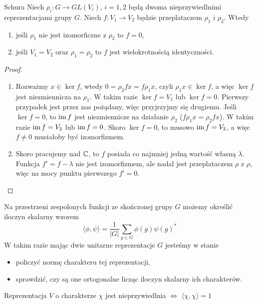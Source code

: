 \begin{lemma}{Schura}{}
  Niech $\rho_i:G\to GL(V_i)$, $i=1,2$ będą dwoma nieprzywiedlnimi reprezentacjami grupy $G$. Niech $f:V_1\to V_2$ będzie przeplataczem $\rho_1$ i $\rho_2$. Wtedy
  \begin{enumerate}
    \item jeśli $\rho_1$ nie jest izomorficzne z $\rho_2$ to $f=0$,
    \item jeśli $V_1=V_2$ oraz $\rho_1=\rho_2$ to $f$ jest wielokrotnością identyczności.
  \end{enumerate}
\end{lemma}

\begin{proof}
  \begin{enumerate}
    \item Rozważmy $x\in\ker f$, wtedy $0=\rho_2 fx=f\rho_1 x$, czyli $\rho_1x\in \ker f$, a więc $\ker f$ jest niezmiennicza na $\rho_1$. W takim razie $\ker f=V_1$ lub $\ker f=0$. Pierwszy przypadek jest przez nas pożądany, więc przyjrzyjmy się drugiemu. Jeśli $\ker f=0$, to $\operatorname{im} f$ jest niezmiennicze na działanie $\rho_2$ ($f\rho_1 x=\rho_2 fx$). W takim razie $\operatorname{im} f=V_2$ lub $\operatorname{im} f=0$. Skoro $\ker f=0$, to musowo $\operatorname{im} f=V_2$, a więc $f\neq 0$ musiałoby być izomorfizmem.
    \item Skoro pracujemy nad $\mathbb{C}$, to $f$ posiada co najmniej jedną wartość własną $\lambda$. Funkcja $f'=f-\lambda$ nie jest izomorfizmem, ale nadal jest przeplataczem $\rho$ z $\rho$, więc na mocy punktu pierwszego $f'=0$.
  \end{enumerate}
\end{proof}

Na przestrzeni zespolonych funkcji ze skończonej grupy $G$ możemy określić iloczyn skalarny wzorem
$$\langle \phi, \psi\rangle=\frac{1}{|G|}\sum_{g\in G}\phi(g)\psi(g)^*$$
W takim razie mając dwie unitarne reprezentacje $G$ jesteśmy w stanie
\begin{itemize}
  \item policzyć normę charakteru tej reprezentacji,
  \item sprawdzić, czy są one ortogonalne licząc iloczyn skalarny ich charakterów.
\end{itemize}



\begin{lemma}{}{}
  Reprezentacja $V$ o charakterze $\chi$ jest nieprzywiedlnia $\iff$ $\langle\chi,\chi\rangle=1$
\end{lemma}

